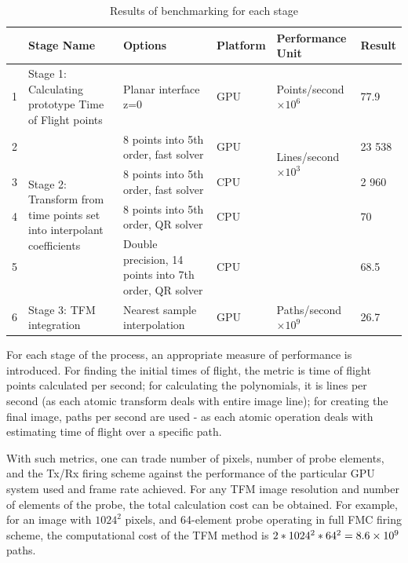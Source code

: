 \begin{table}[htbp!]
\begin{center}
\begin{tabular}{|p{2.5mm}|p{40mm}|p{30mm}|l|p{25mm}|l|}\hline
  & \textbf{Stage Name} & \textbf{Options} & \textbf{Platform} & \textbf{Performance Unit} & \textbf{Result} \\ \hline\hline
	1 & Stage 1: Calculating prototype Time of Flight points & Planar interface z=0 & GPU & Points/second $\times 10^6$ & 77.9 \\ \hline\hline
	2 & \multirow{4}{*}{\parbox{40mm}{Stage 2: Transform from time points set into interpolant coefficients}} & 8 points into 5th order, fast solver & GPU & \multirow{2}{*}{\parbox{25mm}{Lines/second $\times 10^3$}} & 23 538 \\ \cline{1-1} \cline{3-4} \cline{6-6}
  3 & & 8 points into 5th order, fast solver & CPU & & 2 960 \\ \cline{1-1} \cline{3-4} \cline{6-6}
	4 & & 8 points into 5th order, QR solver & CPU & & 70 \\ \cline{1-1} \cline{3-4} \cline{6-6}
	5 & & Double precision, 14 points into 7th order, QR solver & CPU & & 68.5 \\ \hline\hline
	6 & Stage 3: TFM integration & Nearest sample interpolation & GPU & Paths/second $\times 10^9$ & 26.7 \\ \cline{1-6}
\end{tabular}
\caption{Results of benchmarking for each stage}
	\label{table:cuetfm_resuls}
	\end{center}
	\end{table}

For each stage of the process, an appropriate measure of performance is introduced. For finding the initial times of flight, the metric is time of flight points calculated per second; for calculating the polynomials, it is lines per second (as each atomic transform deals with entire image line); for creating the final image, paths per second are used - as each atomic operation deals with estimating time of flight over a specific path. 

With such metrics, one can trade number of pixels, number of probe elements, and the Tx/Rx firing scheme against the performance of the particular GPU system used and frame rate achieved. For any TFM image resolution and number of elements of the probe, the total calculation cost can be obtained. For example, for an image with $1024^{2}$ pixels, and 64-element probe operating in full FMC firing scheme, the computational cost of the TFM method is $2*1024^{2}*64^{2} = 8.6\times 10^{9}$ paths. 

